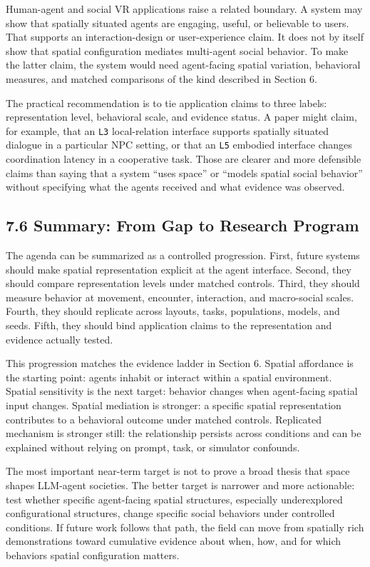 \documentclass[
  twocolumn]{article}
\begin{document}
Human-agent and social VR applications raise a related boundary. A
system may show that spatially situated agents are engaging, useful, or
believable to users. That supports an interaction-design or
user-experience claim. It does not by itself show that spatial
configuration mediates multi-agent social behavior. To make the latter
claim, the system would need agent-facing spatial variation, behavioral
measures, and matched comparisons of the kind described in Section 6.

The practical recommendation is to tie application claims to three
labels: representation level, behavioral scale, and evidence status. A
paper might claim, for example, that an \texttt{L3} local-relation
interface supports spatially situated dialogue in a particular NPC
setting, or that an \texttt{L5} embodied interface changes coordination
latency in a cooperative task. Those are clearer and more defensible
claims than saying that a system ``uses space'' or ``models spatial
social behavior'' without specifying what the agents received and what
evidence was observed.

\subsection{7.6 Summary: From Gap to Research
Program}\label{summary-from-gap-to-research-program}

The agenda can be summarized as a controlled progression. First, future
systems should make spatial representation explicit at the agent
interface. Second, they should compare representation levels under
matched controls. Third, they should measure behavior at movement,
encounter, interaction, and macro-social scales. Fourth, they should
replicate across layouts, tasks, populations, models, and seeds. Fifth,
they should bind application claims to the representation and evidence
actually tested.

This progression matches the evidence ladder in Section 6. Spatial
affordance is the starting point: agents inhabit or interact within a
spatial environment. Spatial sensitivity is the next target: behavior
changes when agent-facing spatial input changes. Spatial mediation is
stronger: a specific spatial representation contributes to a behavioral
outcome under matched controls. Replicated mechanism is stronger still:
the relationship persists across conditions and can be explained without
relying on prompt, task, or simulator confounds.

The most important near-term target is not to prove a broad thesis that
space shapes LLM-agent societies. The better target is narrower and more
actionable: test whether specific agent-facing spatial structures,
especially underexplored configurational structures, change specific
social behaviors under controlled conditions. If future work follows
that path, the field can move from spatially rich demonstrations toward
cumulative evidence about when, how, and for which behaviors spatial
configuration matters.
\end{document}
